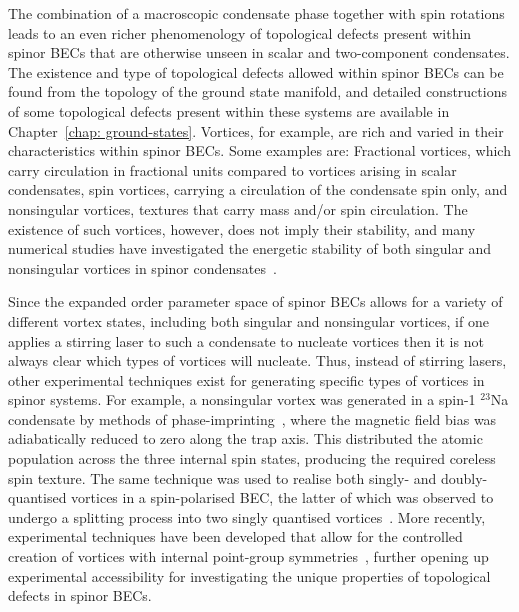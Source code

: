 The combination of a macroscopic condensate phase together with spin rotations
leads to an even richer phenomenology of topological defects present within
spinor BECs that are otherwise unseen in scalar and two-component condensates.
The existence and type of topological defects allowed within spinor BECs can be
found from the topology of the ground state manifold, and detailed constructions
of some topological defects present within these systems
are available in Chapter~\ref{chap: ground-states}.
Vortices, for example, are rich and varied in their characteristics within
spinor BECs.
Some examples are: Fractional vortices, which carry circulation in fractional
units compared to vortices arising in scalar condensates, spin vortices,
carrying a circulation of the condensate spin only, and nonsingular vortices,
textures that carry mass and/or spin circulation.
The existence of such vortices, however, does not imply their stability, and
many numerical studies have investigated the energetic stability of both
singular and nonsingular vortices in spinor condensates~\cite{Isoshima2001,
Mizushima2002, Mizushima2002a,Takahashi2009, Lovegrove2012, Lovegrove2014,
Lovegrove2016}.

Since the expanded order parameter space of spinor BECs allows for a variety of
different vortex states, including both singular and nonsingular vortices, if
one applies a stirring laser to such a condensate to nucleate vortices then it
is not always clear which types of vortices will nucleate.
Thus, instead of stirring lasers, other experimental techniques exist for
generating specific types of vortices in spinor systems.
For example, a nonsingular vortex was generated in a spin-1 \(^{23}\)Na
condensate by methods of phase-imprinting~\cite{Leanhardt2003}, where the
magnetic field bias was adiabatically reduced to zero along the trap axis.
This distributed the atomic population across the three internal spin states,
producing the required coreless spin texture.
The same technique was used to realise both singly- and doubly-quantised
vortices in a spin-polarised BEC, the latter of which was observed to undergo a
splitting process into two singly quantised vortices~\cite{Leanhardt2002,
Shin2004}.
More recently, experimental techniques have been developed that allow for the
controlled creation of vortices with internal point-group
symmetries~\cite{Xiao2022}, further opening up experimental accessibility for
investigating the unique properties of topological defects in spinor BECs.

